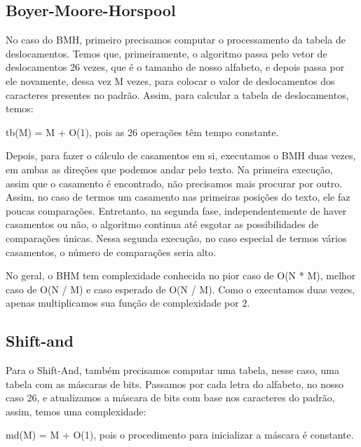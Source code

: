 \documentclass[12pt]{article}
\begin{document}
        \subsection{Boyer-Moore-Horspool}
            No caso do BMH, primeiro precisamos computar o processamento da tabela de deslocamentos. Temos que, primeiramente, o algoritmo 
            passa pelo vetor de deslocamentos 26 vezes, que é o tamanho de nosso alfabeto, e depois passa por ele novamente, dessa vez M 
            vezes, para colocar o valor de deslocamentos dos caracteres presentes no padrão. Assim, para calcular a tabela de deslocamentos, 
            temos:
                \begin{center}
                    tb(M) = M + O(1), pois as 26 operações têm tempo constante.
                \end{center}
            
            Depois, para fazer o cálculo de casamentos em si, executamos o BMH duas vezes, em ambas as direções que podemos andar pelo texto. 
            Na primeira execução, assim que o casamento é encontrado, não precisamos mais procurar por outro. Assim, no caso de termos um 
            casamento nas primeiras posições do texto, ele faz poucas comparações. Entretanto, na segunda fase, independentemente de haver 
            casamentos ou não, o algoritmo continua até esgotar as possibilidades de comparações únicas. Nessa segunda execução, no caso 
            especial de termos vários casamentos, o número de comparações seria alto.
            
            No geral, o BHM tem complexidade conhecida no pior caso de O(N * M), melhor caso de O(N / M) e caso esperado de O(N / M). 
            Como o executamos duas vezes, apenas multiplicamos sua função de complexidade por 2.

        \subsection{Shift-and}
            Para o Shift-And, também precisamos computar uma tabela, nesse caso, uma tabela com as máscaras de bits. Passamos por cada letra 
            do alfabeto, no nosso caso 26, e atualizamos a máscara de bits com base nos caracteres do padrão, assim, temos uma complexidade:
                \begin{center}
                    md(M) = M + O(1), pois o procedimento para inicializar a máscara é constante.
                \end{center}
        
\end{document}
